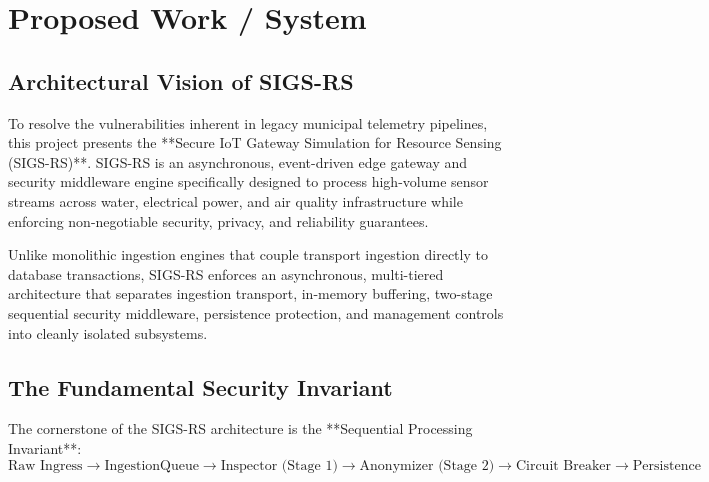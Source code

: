 \section{Proposed Work / System}

\subsection{Architectural Vision of SIGS-RS}
To resolve the vulnerabilities inherent in legacy municipal telemetry pipelines, this project presents the **Secure IoT Gateway Simulation for Resource Sensing (SIGS-RS)**. SIGS-RS is an asynchronous, event-driven edge gateway and security middleware engine specifically designed to process high-volume sensor streams across water, electrical power, and air quality infrastructure while enforcing non-negotiable security, privacy, and reliability guarantees.

Unlike monolithic ingestion engines that couple transport ingestion directly to database transactions, SIGS-RS enforces an asynchronous, multi-tiered architecture that separates ingestion transport, in-memory buffering, two-stage sequential security middleware, persistence protection, and management controls into cleanly isolated subsystems.

\subsection{The Fundamental Security Invariant}
The cornerstone of the SIGS-RS architecture is the **Sequential Processing Invariant**:
\begin{equation}
\label{eq:invariant}
\text{Raw Ingress} \longrightarrow \text{IngestionQueue} \longrightarrow \text{Inspector (Stage 1)} \longrightarrow \text{Anonymizer (Stage 2)} \longrightarrow \text{Circuit Breaker} \longrightarrow \text{Persistence}
\end{equation}

